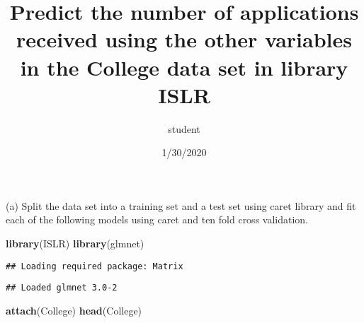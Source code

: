 \documentclass[
  ignorenonframetext,
]{beamer}
\title{Predict the number of applications received using the other variables in
the College data set in library ISLR}
\author{student}
\date{1/30/2020}
\newenvironment{Shaded}{\begin{snugshade}}{\end{snugshade}}
\newcommand{\KeywordTok}[1]{\textcolor[rgb]{0.13,0.29,0.53}{\textbf{#1}}}
\newcommand{\NormalTok}[1]{#1}
\begin{document}
\frame{\titlepage}

\begin{frame}[fragile]{(a) Split the data set into a training set and a
test set using caret library and fit each of the following models using
caret and ten fold cross validation.}
\protect\hypertarget{a-split-the-data-set-into-a-training-set-and-a-test-set-using-caret-library-and-fit-each-of-the-following-models-using-caret-and-ten-fold-cross-validation.}{}

\begin{Shaded}
\begin{Highlighting}[]
\KeywordTok{library}\NormalTok{(ISLR)}
\KeywordTok{library}\NormalTok{(glmnet)}
\end{Highlighting}
\end{Shaded}

\begin{verbatim}
## Loading required package: Matrix
\end{verbatim}

\begin{verbatim}
## Loaded glmnet 3.0-2
\end{verbatim}

\begin{Shaded}
\begin{Highlighting}[]
\KeywordTok{attach}\NormalTok{(College)}
\KeywordTok{head}\NormalTok{(College)}
\end{Highlighting}
\end{Shaded}


\end{frame}
\end{document}
